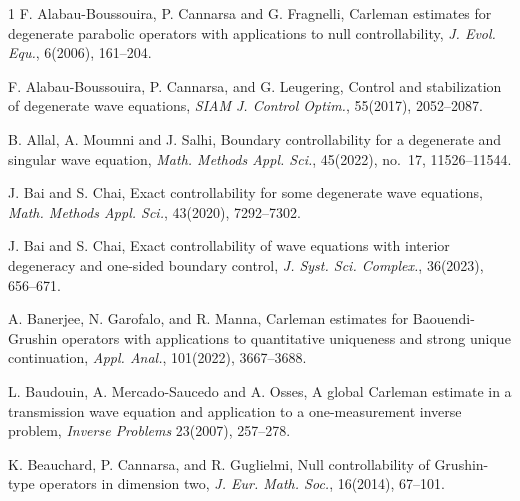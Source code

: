 \documentclass[11pt]{article}
\numberwithin{equation}{section}
\begin{document}
		
		\begin{thebibliography}{1}
			F. Alabau-Boussouira, P. Cannarsa and G. Fragnelli, Carleman estimates for degenerate parabolic operators with applications to null controllability, {\it J. Evol. Equ.}, 6(2006),  161--204.
			
			 F. Alabau-Boussouira, P. Cannarsa,  and G. Leugering,  Control and stabilization of degenerate wave equations,
			{\it SIAM J. Control Optim.},  55(2017), 2052--2087.
			
			 B. Allal, A. Moumni and J. Salhi, Boundary controllability for a degenerate and singular wave equation, {\it Math. Methods Appl. Sci.}, 45(2022), no.~17, 11526--11544.
			
			
			
			
			 J. Bai and S. Chai,  Exact controllability for some degenerate wave equations,
			{\it Math. Methods Appl. Sci.},  43(2020), 7292--7302.
			
			
			 J. Bai and S. Chai,  Exact controllability of wave equations with interior degeneracy and one-sided boundary control,
			{\it  J. Syst. Sci. Complex.},  36(2023),  656--671.
			
			 A. Banerjee, N. Garofalo, and R. Manna,  Carleman estimates for Baouendi-Grushin operators with applications to quantitative uniqueness and strong unique continuation,
			{\it Appl. Anal.},  101(2022), 3667--3688.
			
			
			 L. Baudouin, A. Mercado-Saucedo and A. Osses, A global Carleman estimate in a transmission wave equation and application to a one-measurement inverse problem, {\it Inverse Problems} 23(2007), 257--278.
			
			
			 K. Beauchard, P. Cannarsa,  and R. Guglielmi,  Null controllability of Grushin-type operators in dimension two,
			{\it  J. Eur. Math. Soc.},  16(2014), 67--101.
			

\end{thebibliography}
\end{document}

